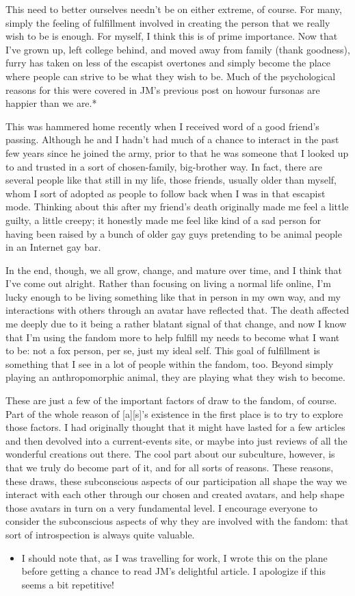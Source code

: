 This need to better ourselves needn't be on either extreme, of course. For many, simply the feeling of fulfillment involved in creating the person that we really wish to be is enough. For myself, I think this is of prime importance. Now that I've grown up, left college behind, and moved away from family (thank goodness), furry has taken on less of the escapist overtones and simply become the place where people can strive to be what they wish to be. Much of the psychological reasons for this were covered in JM's previous post on howour fursonas are happier than we are.*

This was hammered home recently when I received word of a good friend's passing. Although he and I hadn't had much of a chance to interact in the past few years since he joined the army, prior to that he was someone that I looked up to and trusted in a sort of chosen-family, big-brother way. In fact, there are several people like that still in my life, those friends, usually older than myself, whom I sort of adopted as people to follow back when I was in that escapist mode. Thinking about this after my friend's death originally made me feel a little guilty, a little creepy; it honestly made me feel like kind of a sad person for having been raised by a bunch of older gay guys pretending to be animal people in an Internet gay bar.

In the end, though, we all grow, change, and mature over time, and I think that I've come out alright. Rather than focusing on living a normal life online, I'm lucky enough to be living something like that in person in my own way, and my interactions with others through an avatar have reflected that. The death affected me deeply due to it being a rather blatant signal of that change, and now I know that I'm using the fandom more to help fulfill my needs to become what I want to be: not a fox person, per se, just my ideal self. This goal of fulfillment is something that I see in a lot of people within the fandom, too. Beyond simply playing an anthropomorphic animal, they are playing what they wish to become.

These are just a few of the important factors of draw to the fandom, of course. Part of the whole reason of {[}a{]}{[}s{]}'s existence in the first place is to try to explore those factors. I had originally thought that it might have lasted for a few articles and then devolved into a current-events site, or maybe into just reviews of all the wonderful creations out there. The cool part about our subculture, however, is that we truly do become part of it, and for all sorts of reasons. These reasons, these draws, these subconscious aspects of our participation all shape the way we interact with each other through our chosen and created avatars, and help shape those avatars in turn on a very fundamental level. I encourage everyone to consider the subconscious aspects of why they are involved with the fandom: that sort of introspection is always quite valuable.

\begin{itemize}
\tightlist
\item
  I should note that, as I was travelling for work, I wrote this on the plane before getting a chance to read JM's delightful article. I apologize if this seems a bit repetitive!
\end{itemize}
